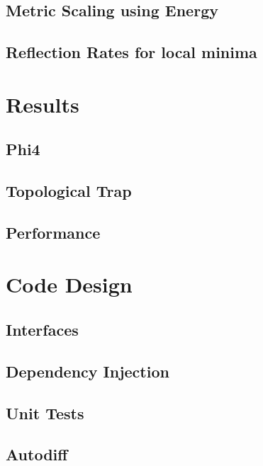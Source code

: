 \documentclass[11pt]{article}
\begin{document}
    \subsection{Metric Scaling using Energy}
    \subsection{Reflection Rates for local minima}

    \section{Results}
    \subsection{Phi4}
    \subsection{Topological Trap}
    \subsection{Performance}


    \appendix
    \section{Code Design}
    \subsection{Interfaces}
    \subsection{Dependency Injection}
    \subsection{Unit Tests}
    \subsection{Autodiff}

\printbibliography
\end{document}
